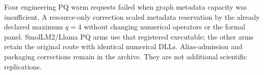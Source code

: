 Four engineering PQ warm requests failed when graph metadata capacity was insufficient. A resource-only correction scaled metadata reservation by the already declared maximum $q=4$ without changing numerical operators or the formal panel. SmolLM2/Llama PQ arms use that registered executable; the other arms retain the original route with identical numerical DLLs. Alias-admission and packaging corrections remain in the archive. They are not additional scientific replications.
